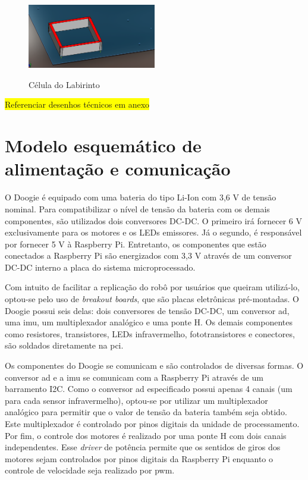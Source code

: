 \begin{figure}[H]
	\centering
	\caption{Célula do Labirinto}
	\includegraphics[width=0.5\textwidth]
	{Figures/maze_cell}
	\label{fig:celula_labirinto}
\end{figure}

\colorbox{yellow}{Referenciar desenhos técnicos em anexo}
\section{Modelo esquemático de alimentação e comunicação}
\label{sec:arquitetura_eletrica_geral}
O Doogie é equipado com uma bateria do tipo Li-Ion com 3,6 V de tensão nominal. Para compatibilizar o nível de tensão da bateria com os demais componentes, são utilizados dois conversores DC-DC. O primeiro irá fornecer 6 V exclusivamente para os motores e os LEDs emissores. Já o segundo, é responsável por fornecer 5 V à Raspberry Pi. Entretanto, os componentes que estão conectados a Raspberry Pi são energizados com 3,3 V através de um conversor DC-DC interno a placa do sistema microprocessado.

Com intuito de facilitar a replicação do robô por usuários que queiram utilizá-lo, optou-se pelo uso de \textit{breakout boards}, que são placas eletrônicas pré-montadas. O Doogie possui seis delas: dois conversores de tensão DC-DC, um conversor \gls*{ad}, uma \gls*{imu}, um multiplexador analógico e uma ponte H. Os demais componentes como resistores, transistores, LEDs infravermelho, fototransistores e conectores, são soldados diretamente na \gls*{pci}.

Os componentes do Doogie se comunicam e são controlados de diversas formas. O conversor \gls*{ad} e a \gls*{imu} se comunicam com a Raspberry Pi através de um barramento I2C. Como o conversor \gls*{ad} especificado possui apenas 4 canais (um para cada sensor infravermelho), optou-se por utilizar um multiplexador analógico para permitir que o valor de tensão da bateria também seja obtido. Este multiplexador é controlado por pinos digitais da unidade de processamento. Por fim, o controle dos motores é realizado por uma ponte H com dois canais independentes. Esse \textit{driver} de potência permite que os sentidos de giros dos motores sejam controlados por pinos digitais da Raspberry Pi enquanto o controle de velocidade seja realizado por \gls*{pwm}.

